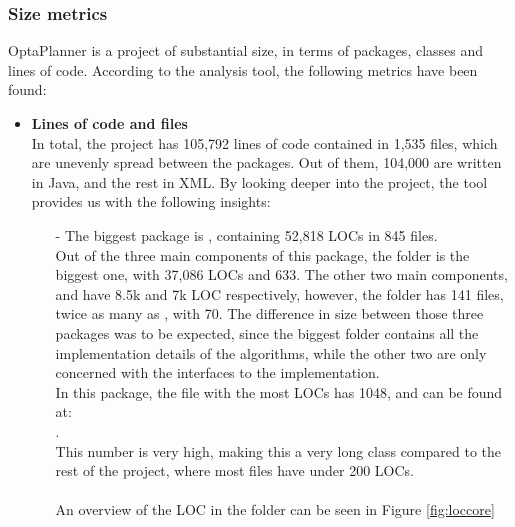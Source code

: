         \subsubsection{Size metrics}
            OptaPlanner is a project of substantial size, in terms of packages, classes and lines of code. According to the analysis tool, the following metrics have been found:
            \begin{itemize}
                \item \textbf{Lines of code and files} \\
                In total, the project has 105,792 lines of code contained in 1,535 files, which are unevenly spread between the packages. Out of them, 104,000 are written in Java, and the rest in XML. By looking deeper into the project, the tool provides us with the following insights:
                    \begin{itemize}
                        \item[-] The biggest package is , containing 52,818 LOCs in 845 files. \\ 
                        Out of the three main components of this package, the  folder is the biggest one, with 37,086 LOCs and 633. The other two main components,  and  have 8.5k and 7k LOC respectively, however, the  folder has 141 files, twice as many as , with 70.
                        The difference in size between those three packages was to be expected, since the biggest folder contains all the implementation details of the algorithms, while the other two are only concerned with the interfaces to the implementation.\\
                        In this package, the file with the most LOCs has 1048, and can be found at: \\ 
                        . \\
                        This number is very high, making this a very long class compared to the rest of the project, where most files have under 200 LOCs.\\\\
                        An overview of the LOC in the  folder can be seen in Figure \ref{fig:loccore}
                        \begin{figure}[H]
                            \centering

\end{figure}
\end{itemize}
\end{itemize}
